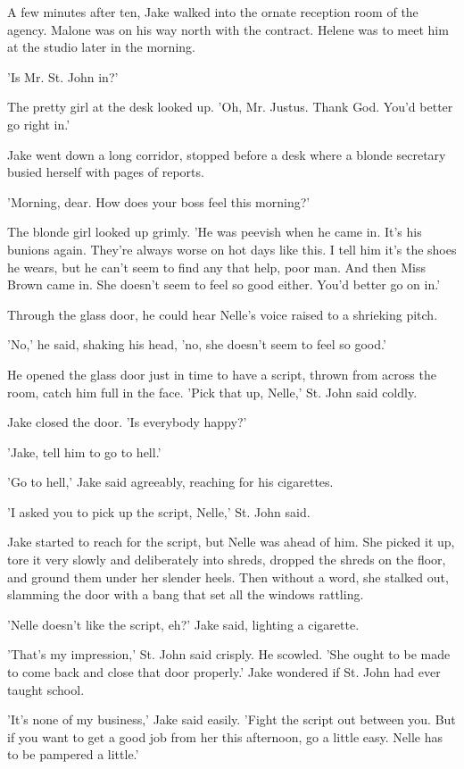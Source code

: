 \documentclass{novel}
\begin{document}
A few minutes after ten, Jake walked into the ornate reception room of the agency. Malone was on his way north with the contract. Helene was to meet him at the studio later in the morning.

'Is Mr. St. John in?'

The pretty girl at the desk looked up. 'Oh, Mr. Justus. Thank God. You’d better go right in.'

Jake went down a long corridor, stopped before a desk where a blonde secretary busied herself with pages of reports.

'Morning, dear. How does your boss feel this morning?'

The blonde girl looked up grimly. 'He was peevish when he came in. It’s his bunions again. They’re always worse on hot days like this. I tell him it’s the shoes he wears, but he can’t seem to find any that help, poor man. And then Miss Brown came in. She doesn’t seem to feel so good either. You’d better go on in.'

Through the glass door, he could hear Nelle’s voice raised to a shrieking pitch.

'No,' he said, shaking his head, 'no, she doesn’t seem to feel so good.'

He opened the glass door just in time to have a script, thrown from across the room, catch him full in the face. 'Pick that up, Nelle,' St. John said coldly.

Jake closed the door. 'Is everybody happy?'

'Jake, tell him to go to hell.'

'Go to hell,' Jake said agreeably, reaching for his cigarettes.

'I asked you to pick up the script, Nelle,' St. John said.

Jake started to reach for the script, but Nelle was ahead of him. She picked it up, tore it very slowly and deliberately into shreds, dropped the shreds on the floor, and ground them under her slender heels. Then without a word, she stalked out, slamming the door with a bang that set all the windows rattling.

'Nelle doesn’t like the script, eh?' Jake said, lighting a cigarette.

'That’s my impression,' St. John said crisply. He scowled. 'She ought to be made to come back and close that door properly.' Jake wondered if St. John had ever taught school.

'It’s none of my business,' Jake said easily. 'Fight the script out between you. But if you want to get a good job from her this afternoon, go a little easy. Nelle has to be pampered a little.'
\end{document}
